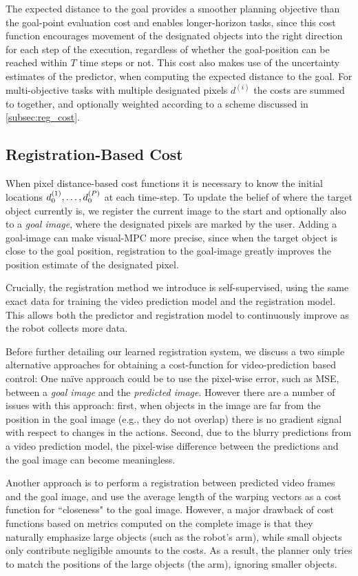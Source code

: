 The expected distance to the goal provides a smoother planning objective than the goal-point evaluation cost and enables longer-horizon tasks, since this cost function encourages movement of the designated objects into the right direction for each step of the execution, regardless of whether the goal-position can be reached within $T$ time steps or not. This cost also makes use of the uncertainty estimates of the predictor, when computing the expected distance to the goal. For multi-objective tasks with multiple designated pixels $d^{(i)}$ the costs are summed to together, and optionally weighted according to a scheme discussed in \autoref{subsec:reg_cost}.  

\subsection{Registration-Based Cost}
\label{subsec:reg_cost}
When pixel distance-based cost functions it is necessary to know the initial locations $d_0^{(1)}, \dots, d_0^{(P)}$ at each time-step. To update the belief of where the target object currently is, we register the current image to the start and optionally also to a \emph{goal image}, where the designated pixels are marked by the user. Adding a goal-image can make visual-MPC more precise, since when the target object is close to the goal position, registration to the goal-image greatly improves the position estimate of the designated pixel. 

Crucially, the registration method we introduce is self-supervised, using the same exact data for training the video prediction model and the registration model. This allows both the predictor and registration model to continuously improve as the robot collects more data.

Before further detailing our learned registration system, we discuss a two simple alternative approaches for obtaining a cost-function for video-prediction based control: One na\"{i}ve approach could be to use the pixel-wise error, such as MSE, between a \emph{goal image} and the \emph{predicted image}. However there are a number of issues with this approach: first, when objects in the image are far from the position in the goal image (e.g., they do not overlap) there is no gradient signal with respect to changes in the actions. Second, due to the blurry predictions from a video prediction model, the pixel-wise difference between the predictions and the goal image can become meaningless. 

Another approach is to perform a registration between predicted video frames and the goal image, and use the average length of the warping vectors as a cost function for ``closeness" to the goal image. However, a major drawback of cost functions based on metrics computed on the complete image is that they naturally emphasize large objects (such as the robot's arm), while small objects only contribute negligible amounts to the costs. As a result, the planner only tries to match the positions of the large objects (the arm), ignoring smaller objects.


